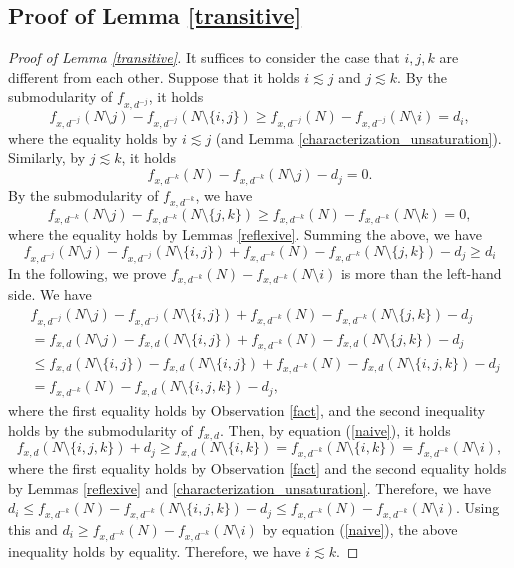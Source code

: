 \documentclass[letterpaper,11pt]{article}
\begin{document}
\subsection{Proof of Lemma \ref{transitive}}
\begin{proof}[Proof of Lemma \ref{transitive}]
 It suffices to consider the case that $i, j, k$ are different from each other.
	Suppose that it holds $i\lesssim j$ and $j\lesssim k$.
	By the submodularity of $f_{x,d^{-j}}$,
	it holds 
	\[f_{x,d^{-j}}(N\setminus j)-f_{x,d^{-j}}(N\setminus \{i,j\})
	\geq f_{x,d^{-j}}(N)-f_{x,d^{-j}}(N\setminus i)=d_i,
	\] 
	where the equality holds by $i\lesssim j$ (and Lemma \ref{characterization_unsaturation}).
	Similarly, by $j\lesssim k$, it holds 
	\[
	f_{x,d^{-k}}(N)-f_{x,d^{-k}}(N\setminus j)-d_j=0.
	\]
	By the submodularity of $f_{x,d^{-k}}$,
	we have 
	\[
	f_{x,d^{-k}}(N\setminus j)-f_{x,d^{-k}}(N\setminus \{j,k\})\geq f_{x,d^{-k}}(N)-f_{x,d^{-k}}(N\setminus k)=0,
	\]
	where the equality holds by Lemmas \ref{reflexive}.
	Summing the above, we have 
	\begin{equation*}
	f_{x,d^{-j}}(N\setminus j)-f_{x,d^{-j}}(N\setminus \{i,j\})+f_{x,d^{-k}}(N)-f_{x,d^{-k}}(N\setminus \{j,k\})-d_j
	\geq d_i
	\end{equation*}
	In the following, we prove $f_{x,d^{-k}}(N)- f_{x,d^{-k}}(N\setminus i)$ is more than the left-hand side.
	We have 
	\begin{align*}
	&f_{x,d^{-j}}(N\setminus j)-f_{x,d^{-j}}(N\setminus \{i,j\})+f_{x,d^{-k}}(N)-f_{x,d^{-k}}(N\setminus \{j,k\})-d_j\\
	&=f_{x,d}(N\setminus j)-f_{x,d}(N\setminus \{i,j\})+f_{x,d^{-k}}(N)-f_{x,d}(N\setminus \{j,k\})-d_j \\
	&\leq f_{x,d}(N\setminus \{i,j\})-f_{x,d}(N\setminus \{i,j\})+f_{x,d^{-k}}(N)-f_{x,d}(N\setminus \{i,j,k\})-d_j \\
	&=f_{x,d^{-k}}(N)-f_{x,d}(N\setminus \{i,j,k\})-d_j,
	\end{align*}
	where the first equality holds by Observation \ref{fact},
	and the second inequality holds by the submodularity of $f_{x,d}$.
	Then, by equation (\ref{naive}), it holds
	\[
	f_{x,d}(N\setminus \{i,j,k\})+d_j \geq f_{x,d}(N\setminus \{i,k\})
	=f_{x,d^{-k}}(N\setminus \{i,k\})= f_{x,d^{-k}}(N\setminus i),
	\]
	where the first equality holds by Observation \ref{fact} and the second equality 
	holds by Lemmas \ref{reflexive} and \ref{characterization_unsaturation}.
	Therefore, we have 
	$d_i\leq f_{x,d^{-k}}(N)-f_{x,d^{-k}}(N\setminus \{i,j,k\})-d_j
	\leq f_{x,d^{-k}}(N)- f_{x,d^{-k}}(N\setminus i)$.
	Using this and $d_i\geq f_{x,d^{-k}}(N)- f_{x,d^{-k}}(N\setminus i)$ by equation (\ref{naive}), 
	the above inequality holds by equality. 
	Therefore, we have $i\lesssim k$. 
\end{proof}
\end{document}
